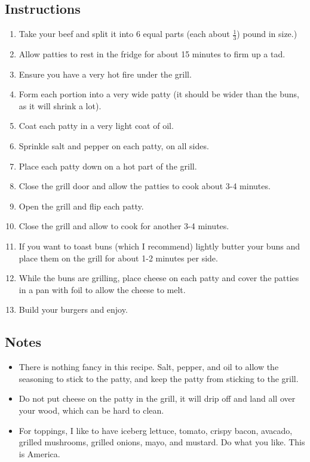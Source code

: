 \begin{multicols}{2}
\subsection*{Instructions}
\begin{enumerate}
    \item Take your beef and split it into 6 equal parts (each about \( \frac{1}{3} \)) pound in size.)
    \item Allow patties to rest in the fridge for about 15 minutes to firm up a tad.
    \item Ensure you have a very hot fire under the grill.
    \item Form each portion into a very wide patty (it should be wider than the buns, as it will shrink a lot).
    \item Coat each patty in a very light coat of oil.
    \item Sprinkle salt and pepper on each patty, on all sides.
    \item Place each patty down on a hot part of the grill.
    \item Close the grill door and allow the patties to cook about 3-4 minutes.
    \item Open the grill and flip each patty.
    \item Close the grill and allow to cook for another 3-4 minutes.
    \item If you want to toast buns (which I recommend) lightly butter your buns and place them on the grill for about 1-2 minutes per side.
    \item While the buns are grilling, place cheese on each patty and cover the patties in a pan with foil to allow the cheese to melt.
    \item Build your burgers and enjoy.

\end{enumerate}

\subsection*{Notes}
\begin{itemize}
    \item There is nothing fancy in this recipe. Salt, pepper, and oil to allow the seasoning to stick to the patty, and keep the patty from sticking to the grill.
    \item Do not put cheese on the patty in the grill, it will drip off and land all over your wood, which can be hard to clean.
    \item For toppings, I like to have iceberg lettuce, tomato, crispy bacon, avacado, grilled mushrooms, grilled onions, mayo, and mustard. Do what you like. This is America.
\end{itemize}
\end{multicols}
\clearpage